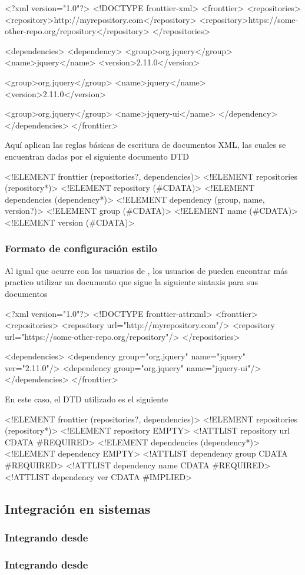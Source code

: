 \begin{jscode}
	<?xml version="1.0"?>
	<!DOCTYPE fronttier-xml>
	<fronttier>
		<repositories>
			<repository>http://myrepository.com</repository>
			<repository>https://some-other-repo.org/repository</repository>
		</repositories>
		
		<dependencies>
			<dependency>
				<group>org.jquery</group>
				<name>jquery</name>
				<version>2.11.0</version>
				
				<group>org.jquery</group>
				<name>jquery</name>
				<version>2.11.0</version>
				
				<group>org.jquery</group>
				<name>jquery-ui</name>
			</dependency>
		</dependencies>
	</fronttier>
\end{jscode}
Aquí aplican las reglas básicas de escritura de documentos XML, las cuales
se encuentran dadas por el siguiente documento DTD
\begin{jscode}
	<!ELEMENT fronttier (repositories?, dependencies)>
	<!ELEMENT repositories (repository*)>
	<!ELEMENT repository (#CDATA)>
	<!ELEMENT dependencies (dependency*)>
	<!ELEMENT dependency (group, name, version?)>
	<!ELEMENT group (#CDATA)>
	<!ELEMENT name (#CDATA)>
	<!ELEMENT version (#CDATA)>
\end{jscode}

\subsubsection{Formato de configuración estilo \ivy}
\label{subsubsec:formats:ivy}

Al igual que ocurre con los usuarios de \maven, los usuarios de \apache
\ivy pueden encontrar más practico utilizar un documento que sigue la
siguiente sintaxis para sus documentos

\begin{jscode}
	<?xml version="1.0"?>
	<!DOCTYPE fronttier-attrxml>
	<fronttier>
		<repositories>
			<repository url="http://myrepository.com"/>
			<repository url="https://some-other-repo.org/repository"/>
		</repositories>
	
		<dependencies>
			<dependency group="org.jquery" name="jquery" ver="2.11.0"/>
			<dependency group="org.jquery" name="jquery-ui"/>
		</dependencies>
	</fronttier>
\end{jscode}
En este caso, el DTD utilizado es el siguiente
\begin{jscode}
	<!ELEMENT fronttier (repositories?, dependencies)>
	<!ELEMENT repositories (repository*)>
	<!ELEMENT repository EMPTY>
	<!ATTLIST repository url CDATA #REQUIRED>
	<!ELEMENT dependencies (dependency*)>
	<!ELEMENT dependency EMPTY>
	<!ATTLIST dependency group CDATA #REQUIRED>
	<!ATTLIST dependency name CDATA #REQUIRED>
	<!ATTLIST dependency ver CDATA #IMPLIED>
\end{jscode}

\subsection{Integración en sistemas}
\label{subsec:guide:systems}

\subsubsection{Integrando desde \scala}
\label{subsubsec:guide:systems:scala}

\subsubsection{Integrando desde \java}
\label{subsubsec:guide:system:java}